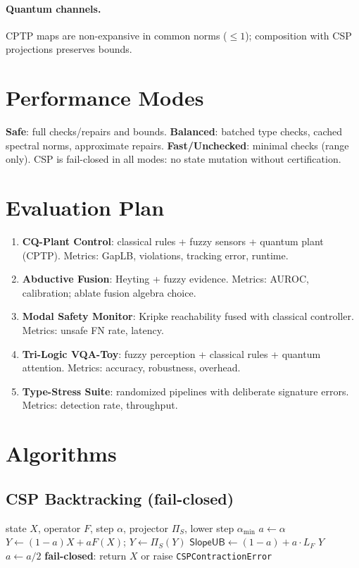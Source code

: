 \documentclass[11pt]{article}
\begin{document}
\paragraph{Quantum channels.} CPTP maps are non-expansive in common norms ($\le 1$); composition with CSP projections preserves bounds.

\section{Performance Modes}
\textbf{Safe}: full checks/repairs and bounds. \textbf{Balanced}: batched type checks, cached spectral norms, approximate repairs. \textbf{Fast/Unchecked}: minimal checks (range only). CSP is fail-closed in all modes: no state mutation without certification.

\section{Evaluation Plan}
\begin{enumerate}
  \item \textbf{CQ-Plant Control}: classical rules + fuzzy sensors + quantum plant (CPTP). Metrics: \textsf{GapLB}, violations, tracking error, runtime.
  \item \textbf{Abductive Fusion}: Heyting + fuzzy evidence. Metrics: AUROC, calibration; ablate fusion algebra choice.
  \item \textbf{Modal Safety Monitor}: Kripke reachability fused with classical controller. Metrics: unsafe FN rate, latency.
  \item \textbf{Tri-Logic VQA-Toy}: fuzzy perception + classical rules + quantum attention. Metrics: accuracy, robustness, overhead.
  \item \textbf{Type-Stress Suite}: randomized pipelines with deliberate signature errors. Metrics: detection rate, throughput.
\end{enumerate}

\section{Algorithms}
\subsection{CSP Backtracking (fail-closed)}
\begin{algorithm}
\caption{CSP step with contraction certificate}\label{alg:csp}
\begin{algorithmic}[1]
\Require state $X$, operator $F$, step $\alpha$, projector $\Pi_S$, lower step $\alpha_{\min}$
\State $a\gets \alpha$
\Repeat
  \State $Y \gets (1-a)X + a F(X)$; \quad $Y\gets \Pi_S(Y)$
  \State $\textsf{SlopeUB} \gets (1-a) + a \cdot L_F$ 
   \State \Return $Y$ \EndIf
  \State $a \gets a/2$
\State \textbf{fail-closed}: return $X$ or raise \texttt{CSPContractionError}
\end{algorithmic}
\end{algorithm}
\end{document}

